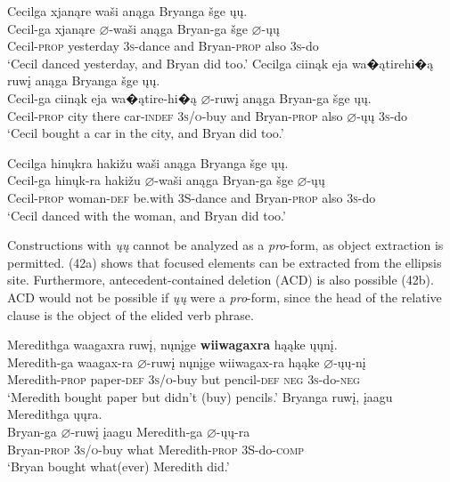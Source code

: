 \documentclass[output=paper]{LSP/langsci}
\begin{document}
\begin{exe}
\ex
\begin{xlist}
\ex 
\glll Cecilga 			xjanąre		wa\v{s}i anąga	Bryanga			\v{s}ge  	\k{u}\k{u}.\\
Cecil-ga			xjanąre		$\varnothing$-wa\v{s}i		anąga	Bryan-ga			\v{s}ge		$\varnothing$-\k{u}\k{u} \\
	Cecil-\textsc{prop}		yesterday	\textsc{3s}-dance	and			Bryan-\textsc{prop}	also	\textsc{3s}-do \\
\trans `Cecil danced yesterday, and Bryan did too.'
\ex 
\glll Cecilga 			ciinąk	eja		wa�ątirehi�ą		ruw\k{i}	anąga	Bryanga			\v{s}ge  \k{u}\k{u}. \\
Cecil-ga			ciinąk	eja		wa�ątire-hi�ą	$\varnothing$-ruw\k{i}			anąga	Bryan-ga	\v{s}ge \k{u}\k{u}. \\
Cecil-\textsc{prop}	city there	car-\textsc{indef}	\textsc{3s/o}-buy and Bryan-\textsc{prop}	also $\varnothing$-\k{u}\k{u} \textsc{3s}-do \\
\trans `Cecil bought a car in the city, and Bryan did too.'

\ex 
\glll Cecilga 		hin\k{u}kra	haki\v{z}u		wa\v{s}i		anąga	Bryanga			\v{s}ge		\k{u}\k{u}.\\
Cecil-ga		hin\k{u}k-ra	haki\v{z}u		$\varnothing$-wa\v{s}i		anąga	Bryan-ga	\v{s}ge		$\varnothing$-\k{u}\k{u} \\	Cecil-\textsc{prop}		woman-\textsc{def} 	be.with		3S-dance	and			Bryan-\textsc{prop}	also	\textsc{3s}-do \\
\trans `Cecil danced with the woman, and Bryan did too.'
\end{xlist}
\end{exe}

Constructions with \textit{\k{u}\k{u}} cannot be analyzed as a \textit{pro}-form, as object extraction is permitted. (42a) shows that focused elements can be extracted from the ellipsis site. Furthermore, antecedent-contained deletion (ACD) is also possible (42b). ACD would not be possible if \textit{\k{u}\k{u}} were a \textit{pro}-form, since the head of the relative clause is the object of the elided verb phrase.

\ea
\ea
\glll Meredithga		waagaxra	ruw\k{i},		n\k{u}n\k{i}ge		\textbf{wiiwagaxra}	hąąke	\k{u}\k{u}n\k{i}.\\
Meredith-ga  waagax-ra	 $\varnothing$-ruw\k{i} 	n\k{u}n\k{i}ge		wiiwagax-ra	hąąke $\varnothing$-\k{u}\k{u}-n\k{i}\\
Meredith-\textsc{prop}	paper-\textsc{def}	\textsc{3s/o}-buy	but pencil-\textsc{def} \textsc{neg}	 \textsc{3s}-do-\textsc{neg}\\
\trans `Meredith bought paper but didn't (buy) pencils.'
\ex
\glll  Bryanga			ruw\k{i},				\k{i}aagu		Meredithga			\k{u}\k{u}ra.\\
Bryan-ga			$\varnothing$-ruw\k{i}	\k{i}aagu		Meredith-ga	$\varnothing$-\k{u}\k{u}-ra\\
	Bryan-\textsc{prop}	\textsc{3s/o}-buy		what		Meredith-\textsc{prop}		3S-do-\textsc{comp}\\
\trans `Bryan bought what(ever) Meredith did.'
\z
\z
\end{document}
